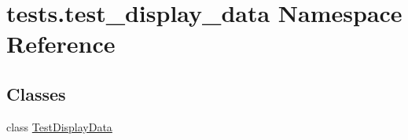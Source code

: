 \hypertarget{namespacetests_1_1test__display__data}{}\section{tests.\+test\+\_\+display\+\_\+data Namespace Reference}
\label{namespacetests_1_1test__display__data}
\subsection*{Classes}
\begin{DoxyCompactItemize}
\item 
class \hyperlink{classtests_1_1test__display__data_1_1TestDisplayData}{Test\+Display\+Data}
\end{DoxyCompactItemize}
